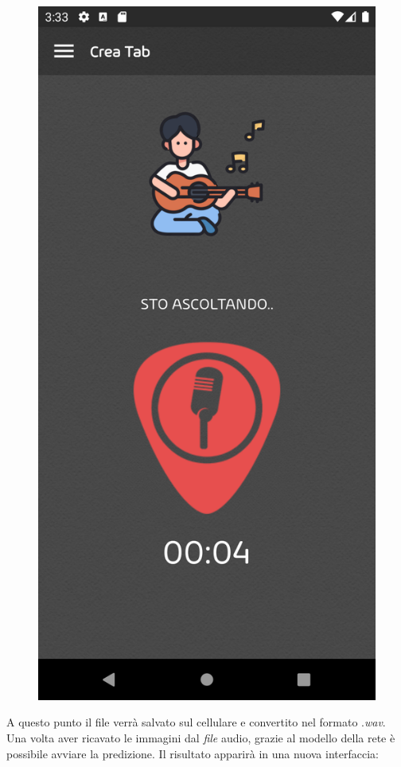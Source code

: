 \begin{figure}[H]
	\includegraphics[scale=0.10]{./images/img22.png}
\end{figure}
\noindent A questo punto il file verrà salvato sul cellulare e convertito nel formato .\textit{wav}. Una volta aver ricavato le immagini dal \textit{file} audio, grazie al modello della rete è possibile avviare la predizione. Il risultato apparirà in una nuova interfaccia:
